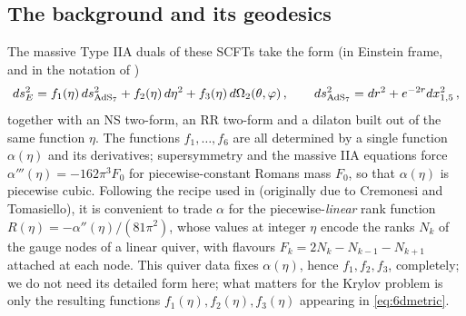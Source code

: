 \documentclass[11pt]{article}
\begin{document}
\subsection{The background and its geodesics}
\label{subsec:6dbackground}

The massive Type IIA duals of these SCFTs take the form (in Einstein frame, and in the notation of \cite{Fatemiabhari:2026rob})
\begin{equation}
ds_E^2 = f_1(\eta)\,ds^2_{{\rm AdS}_7} + f_2(\eta)\,d\eta^2 + f_3(\eta)\,d\Omega_2(\theta,\varphi)\,,
\qquad
ds^2_{{\rm AdS}_7} = dr^2 + e^{-2r}dx_{1,5}^2\,,
\label{eq:6dmetric}
\end{equation}
together with an NS two-form, an RR two-form and a dilaton built out of the same function $\eta$. The functions $f_1,\dots,f_6$ are all determined by a single function $\alpha(\eta)$ and its derivatives; supersymmetry and the massive IIA equations force $\alpha'''(\eta)=-162\pi^3F_0$ for piecewise-constant Romans mass $F_0$, so that $\alpha(\eta)$ is piecewise cubic. Following the recipe used in \cite{Fatemiabhari:2026rob} (originally due to Cremonesi and Tomasiello), it is convenient to trade $\alpha$ for the piecewise-\emph{linear} rank function $R(\eta)=-\alpha''(\eta)/(81\pi^2)$, whose values at integer $\eta$ encode the ranks $N_k$ of the gauge nodes of a linear quiver, with flavours $F_k=2N_k-N_{k-1}-N_{k+1}$ attached at each node. This quiver data fixes $\alpha(\eta)$, hence $f_1,f_2,f_3$, completely; we do not need its detailed form here; what matters for the Krylov problem is only the resulting functions $f_1(\eta),f_2(\eta),f_3(\eta)$ appearing in \eqref{eq:6dmetric}.
\end{document}
